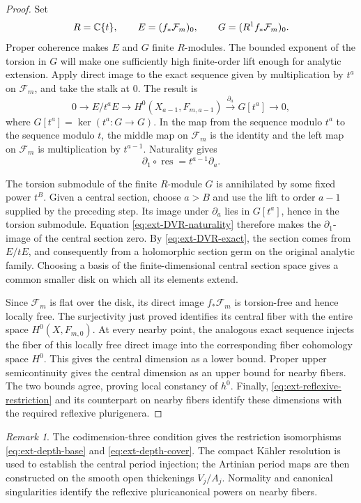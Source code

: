 \documentclass[11pt,a4paper]{article}
\theoremstyle{definition}\newtheorem{definition}[theorem]{Definition}
\theoremstyle{remark}\newtheorem*{remark}{Remark}
\newcommand{\cF}{\mathcal F}\newcommand{\cX}{\mathcal X}
\begin{document}
\begin{proof}
Set
\[
 R=\C\{t\},\qquad E=(f_*\cF_m)_0,\qquad
 G=(R^1f_*\cF_m)_0.
\]
Proper coherence makes $E$ and $G$ finite $R$-modules.
The bounded exponent of the torsion in $G$ will make one sufficiently
high finite-order lift enough for analytic extension.
Apply direct image to the exact sequence given by multiplication
by $t^a$ on $\cF_m$, and take the stalk at $0$. The result is
\begin{equation}\label{eq:ext-DVR-exact}
 0\longrightarrow E/t^aE
 \longrightarrow H^0(X_{a-1},F_{m,a-1})
 \xrightarrow{\ \partial_a\ }G[t^a]\longrightarrow0,
\end{equation}
where $G[t^a]=\ker(t^a:G\to G)$.
In the map from the sequence modulo $t^a$ to the sequence modulo $t$,
the middle map on $\cF_m$ is the identity and the left map on
$\cF_m$ is multiplication by $t^{a-1}$.
Naturality gives
\begin{equation}\label{eq:ext-DVR-naturality}
 \partial_1\circ\operatorname{res}=t^{a-1}\partial_a.
\end{equation}

The torsion submodule of the finite $R$-module $G$ is annihilated
by some fixed power $t^B$.
Given a central section, choose $a>B$ and use the lift to order
$a-1$ supplied by the preceding step.
Its image under $\partial_a$ lies in $G[t^a]$, hence in the torsion
submodule. Equation \eqref{eq:ext-DVR-naturality} therefore makes
the $\partial_1$-image of the central section zero.
By \eqref{eq:ext-DVR-exact}, the section comes from $E/tE$,
and consequently from a holomorphic section germ on the original
analytic family.
Choosing a basis of the finite-dimensional central
section space gives a common smaller disk on which all its elements
extend.

Since $\cF_m$ is flat over the disk, its direct image $f_*\cF_m$
is torsion-free and hence locally free.
The surjectivity just proved identifies its central fiber with
the entire space $H^0(X,F_{m,0})$.
At every nearby point, the analogous exact sequence injects the fiber
of this locally free direct image into the corresponding fiber
cohomology space $H^0$. This gives the central dimension as a lower
bound. Proper upper semicontinuity gives the central dimension as an
upper bound for nearby fibers. The two bounds agree, proving local
constancy of $h^0$.
Finally, \eqref{eq:ext-reflexive-restriction} and its counterpart on
nearby fibers identify these dimensions with the required reflexive
plurigenera.
\end{proof}

\begin{remark}
The codimension-three condition gives the restriction isomorphisms
\eqref{eq:ext-depth-base} and \eqref{eq:ext-depth-cover}.
The compact Kähler resolution is used to establish the central
period injection; the Artinian period maps are then constructed on
the smooth open thickenings $V_j/A_j$.
Normality and canonical singularities identify the reflexive
pluricanonical powers on nearby fibers.
\end{remark}
\end{document}
